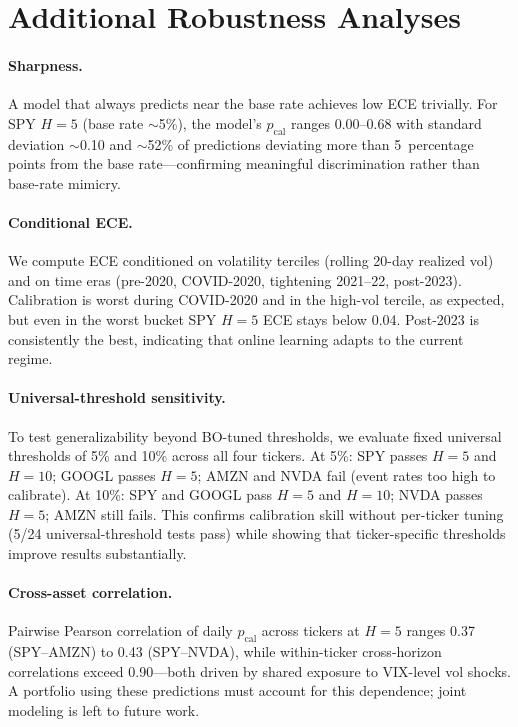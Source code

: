 \documentclass[11pt,a4paper]{article}
\newcommand{\pcal}{p_{\text{cal}}}
\begin{document}
\section{Additional Robustness Analyses}
\label{app:robustness}

\paragraph{Sharpness.}
A model that always predicts near the base rate achieves low ECE trivially. For SPY $H\!=\!5$ (base rate $\sim$5\%), the model's $\pcal$ ranges 0.00--0.68 with standard deviation $\sim$0.10 and $\sim$52\% of predictions deviating more than 5~percentage points from the base rate---confirming meaningful discrimination rather than base-rate mimicry.

\paragraph{Conditional ECE.}
We compute ECE conditioned on volatility terciles (rolling 20-day realized vol) and on time eras (pre-2020, COVID-2020, tightening 2021--22, post-2023). Calibration is worst during COVID-2020 and in the high-vol tercile, as expected, but even in the worst bucket SPY $H\!=\!5$ ECE stays below 0.04. Post-2023 is consistently the best, indicating that online learning adapts to the current regime.

\paragraph{Universal-threshold sensitivity.}
To test generalizability beyond BO-tuned thresholds, we evaluate fixed universal thresholds of 5\% and 10\% across all four tickers. At 5\%: SPY passes $H\!=\!5$ and $H\!=\!10$; GOOGL passes $H\!=\!5$; AMZN and NVDA fail (event rates too high to calibrate). At 10\%: SPY and GOOGL pass $H\!=\!5$ and $H\!=\!10$; NVDA passes $H\!=\!5$; AMZN still fails. This confirms calibration skill without per-ticker tuning (5/24 universal-threshold tests pass) while showing that ticker-specific thresholds improve results substantially.

\paragraph{Cross-asset correlation.}
Pairwise Pearson correlation of daily $\pcal$ across tickers at $H\!=\!5$ ranges 0.37 (SPY--AMZN) to 0.43 (SPY--NVDA), while within-ticker cross-horizon correlations exceed 0.90---both driven by shared exposure to VIX-level vol shocks. A portfolio using these predictions must account for this dependence; joint modeling is left to future work.
\end{document}
